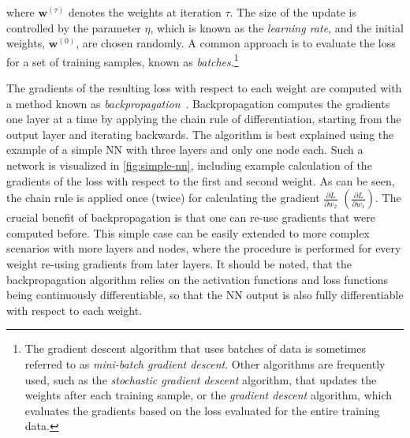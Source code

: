 where $\pmb{w}^{(\tau)}$ denotes the weights at iteration $\tau$.
The size of the update is controlled by the parameter $\eta$, which is known as the \emph{learning rate}, and the initial weights, $\pmb{w}^{(0)}$, are chosen randomly. A common approach is to evaluate the loss for a set of training samples, known as \emph{batches}.\footnote{The gradient descent algorithm that uses batches of data is sometimes referred to as \emph{mini-batch gradient descent}. Other algorithms are frequently used, such as the \emph{stochastic gradient descent} algorithm, that updates the weights after each training sample, or the \emph{gradient descent} algorithm, which evaluates the gradients based on the loss evaluated for the entire training data.} 

The gradients of the resulting loss with respect to each weight are computed with a method known as \emph{backpropagation}~\cite{Rumelhart_1986}. Backpropagation computes the gradients one layer at a time by applying the chain rule of differentiation, starting from the output layer and iterating backwards.
The algorithm is best explained using the example of a simple NN with three layers and only one node each. Such a network is visualized in \cref{fig:simple-nn}, including example calculation of the gradients of the loss with respect to the first and second weight.
As can be seen, the chain rule is applied once (twice) for calculating the gradient $\frac{\partial L}{\partial w_2}$ $\left( \frac{\partial L}{\partial w_1}\right)$. 
The crucial benefit of backpropagation is that one can re-use gradients that were computed before. 
This simple case can be easily extended to more complex scenarios with more layers and nodes, where the procedure is performed for every weight re-using gradients from later layers.
It should be noted, that the backpropagation algorithm relies on the activation functions and loss functions being continuously differentiable, so that the NN output is also fully differentiable with respect to each weight.


